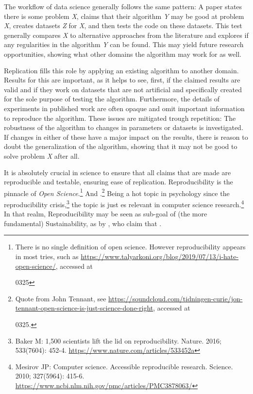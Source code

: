 
The workflow of data science generally follows the same pattern: A paper states there is some problem \textit{X}, claims that their algorithm \textit{Y} may be good at problem \textit{X}, creates datasets \textit{Z} for \textit{X}, and then tests the code on these datasets. This test generally compares \textit{X} to alternative approaches from the literature and explores if any regularities in the algorithm \textit{Y} can be found. This may yield future research opportunities, showing what other domains the algorithm may work for as well.

Replication fills this role by applying an existing algorithm to another domain. Results for this are important, as it helps to see, first, if the claimed results are valid and if they work on datasets that are not artificial and specifically created for the sole purpose of testing the algorithm. Furthermore, the details of experiments in published work are often opaque and omit important information to reproduce the algorithm. These issues are mitigated trough repetition: The robustness of the algorithm to changes in parameters or datasets is investigated. If changes in either of these have a major impact on the results, there is reason to doubt the generalization of the algorithm, showing that it may not be good to solve problem \textit{X} after all.

It is absolutely crucial in science to ensure that all claims that are made are reproducible and testable, ensuring ease of replication. Reproducibility is the pinnacle of \textit{Open Science}.\footnote{There is no single definition of open science. However reproducibility appears in most tries, such as \eg \url{https://www.talyarkoni.org/blog/2019/07/13/i-hate-open-science/}, accessed at \date{2022}{03}{25}} And .\footnote{Quote from John Tennant, see \eg \url{https://soundcloud.com/tidningen-curie/jon-tennant-open-science-is-just-science-done-right}, accessed at \date{2022}{03}{25}.} 
Being a hot topic in psychology since the reproducibility crisis,\footnote{Baker M: 1,500 scientists lift the lid on reproducibility. Nature. 2016; 533(7604): 452-4. \url{https://www.nature.com/articles/533452a}} the topic is just es relevant in computer science research.\footnote{Mesirov JP: Computer science. Accessible reproducible research. Science. 2010; 327(5964): 415-6. \url{https://www.ncbi.nlm.nih.gov/pmc/articles/PMC3878063/}} In that realm, Reproducibility may be seen as sub-goal of (the more fundamental) Sustainability, as \eg by \textcite{Molder2021a}, who claim that .

